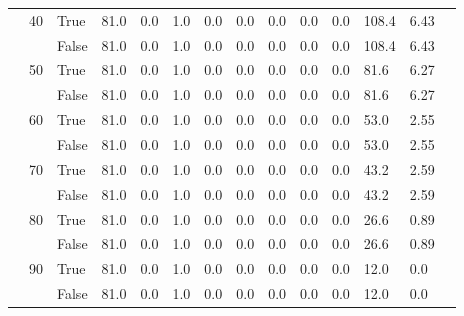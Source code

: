 \begin{landscape}
\begin{small}
\begin{longtable}[c]{@{}lll|ll|ll|ll|ll|lll@{}}
   & 40 & True  & 81.0            & 0.0            & 1.0           & 0.0           & 0.0           & 0.0           & 0.0           & 0.0           & 108.4         & 6.43        &  \\
   &    & False & 81.0            & 0.0            & 1.0           & 0.0           & 0.0           & 0.0           & 0.0           & 0.0           & 108.4         & 6.43        &  \\
   & 50 & True  & 81.0            & 0.0            & 1.0           & 0.0           & 0.0           & 0.0           & 0.0           & 0.0           & 81.6          & 6.27        &  \\
   &    & False & 81.0            & 0.0            & 1.0           & 0.0           & 0.0           & 0.0           & 0.0           & 0.0           & 81.6          & 6.27        &  \\
   & 60 & True  & 81.0            & 0.0            & 1.0           & 0.0           & 0.0           & 0.0           & 0.0           & 0.0           & 53.0          & 2.55        &  \\
   &    & False & 81.0            & 0.0            & 1.0           & 0.0           & 0.0           & 0.0           & 0.0           & 0.0           & 53.0          & 2.55        &  \\
   & 70 & True  & 81.0            & 0.0            & 1.0           & 0.0           & 0.0           & 0.0           & 0.0           & 0.0           & 43.2          & 2.59        &  \\
   &    & False & 81.0            & 0.0            & 1.0           & 0.0           & 0.0           & 0.0           & 0.0           & 0.0           & 43.2          & 2.59        &  \\
   & 80 & True  & 81.0            & 0.0            & 1.0           & 0.0           & 0.0           & 0.0           & 0.0           & 0.0           & 26.6          & 0.89        &  \\
   &    & False & 81.0            & 0.0            & 1.0           & 0.0           & 0.0           & 0.0           & 0.0           & 0.0           & 26.6          & 0.89        &  \\
   & 90 & True  & 81.0            & 0.0            & 1.0           & 0.0           & 0.0           & 0.0           & 0.0           & 0.0           & 12.0          & 0.0         &  \\
   &    & False & 81.0            & 0.0            & 1.0           & 0.0           & 0.0           & 0.0           & 0.0           & 0.0           & 12.0          & 0.0         &  \\

\end{longtable}
\end{small}
\end{landscape}
